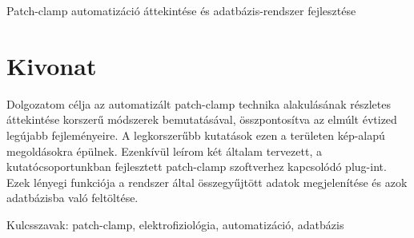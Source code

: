\documentclass[12pt,a4paper]{report}
\begin{document}

\begin{center}
    \vspace*{2cm}
    {\LARGE Patch-clamp automatizáció áttekintése és adatbázis-rendszer fejlesztése}
    \vspace*{1cm}
\end{center}

\section*{Kivonat}
Dolgozatom célja az automatizált patch-clamp technika alakulásának részletes áttekintése korszerű módszerek bemutatásával, összpontosítva az elmúlt évtized legújabb fejleményeire. A legkorszerűbb kutatások ezen a területen kép-alapú megoldásokra épülnek. Ezenkívül leírom két általam tervezett, a kutatócsoportunkban fejlesztett patch-clamp szoftverhez kapcsolódó plug-int. Ezek lényegi funkciója a rendszer által összegyűjtött adatok megjelenítése és azok adatbázisba való feltöltése.

\vspace{1cm}

Kulcsszavak: patch-clamp, elektrofiziológia, automatizáció, adatbázis
\end{document}
